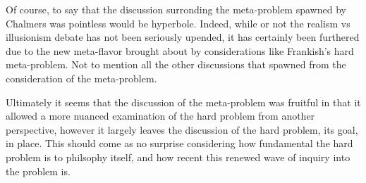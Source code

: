 \documentclass[11pt]{article}
\begin{document}
Of course, to say that the discussion surronding the meta-problem spawned by Chalmers was pointless would be hyperbole. Indeed, while or not the realism vs illusionism debate has not been seriously upended, it has certainly been furthered due to the new meta-flavor brought about by considerations like Frankish's hard meta-problem. Not to mention all the other discussions that spawned from the consideration of the meta-problem.

Ultimately it seems that the discussion of the meta-problem was fruitful in that it allowed a more nuanced examination of the hard problem from another perspective, however it largely leaves the discussion of the hard problem, its goal, in place. This should come as no surprise considering how fundamental the hard problem is to philsophy itself, and how recent this renewed wave of inquiry into the problem is.



\end{document}
